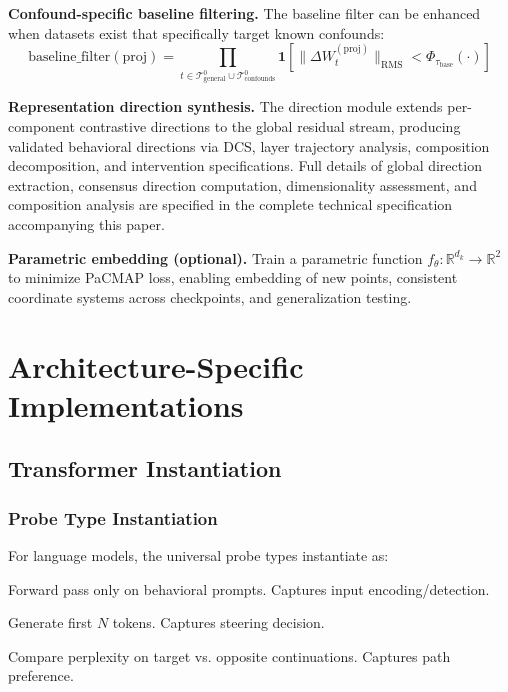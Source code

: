 \documentclass[11pt]{article}
\begin{document}
\noindent\textbf{Confound-specific baseline filtering.} The baseline filter can be enhanced when datasets exist that specifically target known confounds:
\begin{equation}
\text{baseline\_filter}(\text{proj}) = \prod_{t \in \mathcal{T}^0_{\text{general}} \cup \mathcal{T}^0_{\text{confounds}}} \mathbf{1}\left[\|\Delta W^{(\text{proj})}_t\|_{\text{RMS}} < \Phi_{\tau_{\text{base}}}(\cdot)\right]
\end{equation}

\noindent\textbf{Representation direction synthesis.} The direction module extends per-component contrastive directions to the global residual stream, producing validated behavioral directions via DCS, layer trajectory analysis, composition decomposition, and intervention specifications. Full details of global direction extraction, consensus direction computation, dimensionality assessment, and composition analysis are specified in the complete technical specification accompanying this paper.

\noindent\textbf{Parametric embedding (optional).} Train a parametric function $f_\theta: \mathbb{R}^{d_k} \to \mathbb{R}^2$ to minimize PaCMAP loss, enabling embedding of new points, consistent coordinate systems across checkpoints, and generalization testing.


\section{Architecture-Specific Implementations}
\label{app:arch}

\subsection{Transformer Instantiation}

\subsubsection{Probe Type Instantiation}

For language models, the universal probe types instantiate as:
\begin{description}[leftmargin=2em, nosep]
\item[$\pi_R$ (Recognition):] Forward pass only on behavioral prompts. Captures input encoding/detection.
\item[$\pi_F$ (Free Generation):] Generate first $N$ tokens. Captures steering decision.
\item[$\pi_T$ (Teacher Forcing):] Compare perplexity on target vs. opposite continuations. Captures path preference.
\end{description}
\end{document}
